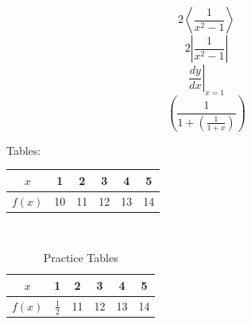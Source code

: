 \documentclass[11pt]{article}
\begin{document}
$$2\left \langle \frac{1}{x^2-1}\right \rangle $$
$$2\left | \frac{1}{x^2-1}\right | $$
$$\left. \frac{dy}{dx}\right|_{x=1}$$
$$\left(\frac{1}{1+\left(\frac{1}{1+x}\right)}\right)$$


Tables:\\[6pt]
\begin{tabular}{|c|c|c|c|c|c|}
    \hline
    $x$ & 1 & 2 & 3 & 4 & 5\\ \hline
    $f(x)$ & 10 & 11 & 12 & 13 &14\\ \hline   
\end{tabular}
\\[6pt]
\begin{table}[H]
    \centering
 \def\arraystretch{1.5}   
    \begin{tabular}{|c|c|c|c|c|c|}
    \hline
    $x$ & 1 & 2 & 3 & 4 & 5\\ \hline
    $f(x)$ & $\frac{1}{2}$ & 11 & 12 & 13 &14\\ \hline
\end{tabular}
\caption{Practice Tables}
\end{table}
\end{document}

